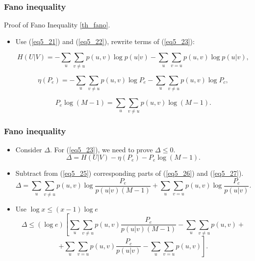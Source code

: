\documentclass[14pt]{beamer}
\begin{document}
\begin{frame}
\frametitle{Fano inequality}

Proof of Fano Inequality \ref{th_fano}. 
\begin{itemize}

    
    \item
    Use (\ref{eq5_21}) and (\ref{eq5_22}), rewrite terms of (\ref{eq5_23}):
    
\footnotesize {    
    \begin{equation}
    \label{eq5_25} H(U\vert V) = - \sum\limits_u {\sum\limits_{v \ne
    u} {p(u,v)\log p(u\vert v)} } - \sum\limits_u {\sum\limits_{v = u}
    {p(u,v)\log p(u\vert v)} } ,
    \end{equation}
    

    \begin{equation}
    \label{eq5_26} \eta(P_e ) = - \sum\limits_u {\sum\limits_{v \ne u}
    {p(u,v)\log P_e - } } \sum\limits_u {\sum\limits_{v \ne u}
    {p(u,v)\log P_c } } ,
    \end{equation}


    \begin{equation}
    \label{eq5_27} P_e \log (M - 1) = \sum\limits_u {\sum\limits_{v
    \ne u} {p(u,v)\log (M - 1)} } .
    \end{equation}
}
\end{itemize}
\end{frame}

\begin{frame}
\frametitle{Fano inequality}
\begin{itemize}

    \item Consider $\Delta$. For (\ref{eq5_23}), we need to prove $\Delta \le 0$.
    \[
    \Delta = H(U\vert V) - \eta(P_e ) - P_e \log (M - 1).
    \]
    
    \item Subtract from (\ref{eq5_25}) corresponding parts of (\ref{eq5_26}) and (\ref{eq5_27}).
    \footnotesize {
    \[
    \Delta = \sum\limits_u {\sum\limits_{v \ne u} {p(u,v)\log \frac{P_e}{p(u\vert v)(M - 1)} + } } \sum\limits_u {\sum\limits_{v = u} {p(u,v)\log \frac{P_c }{p(u\vert v)}} } .
    \]
    }
    \normalsize
    
    \item Use $ \log x \le (x - 1)\log e$
    \footnotesize {
    \[
    \Delta \le (\log e) \left[%
    \sum_u \sum_{v \ne u} p(u,v)\frac{P_e }{p(u\vert v)(M - 1)} - %
    \sum_u \sum_{v \ne u} {p(u,v)} + \right.
    \]
    \[
    \left. %
    +\sum_u \sum_{v = u} p(u,v)\frac{P_c }{p(u\vert v)} - %
    \sum_u \sum_{v = u} p(u,v) \right].
    \]
    }

\end{itemize}
\end{frame}
\end{document}
